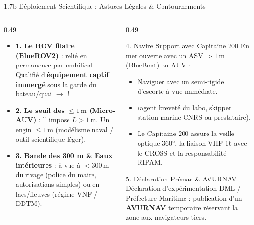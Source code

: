 \begin{frame}{1.7b Déploiement Scientifique : Astuces Légales \& Contournements}
  \begin{columns}[T]
    \begin{column}{0.49\textwidth}
      \begin{block}{}
        \scriptsize
        \begin{itemize}
          \item \textbf{1. Le ROV filaire (BlueROV2)} : relié en permanence par ombilical. Qualifié d'\textbf{équipement captif immergé} sous la garde du bateau/quai $\rightarrow$  !
          \item \textbf{2. Le seuil des $\le 1\,\text{m}$ (Micro-AUV)} : l'\href{https://www.legifrance.gouv.fr/codes/article_lc/LEGIARTI000049585210}{\underline{}} impose $L > 1\,\text{m}$. Un engin $\le 1\,\text{m}$  (modélisme naval / outil scientifique léger).
          \item \textbf{3. Bande des 300 m \& Eaux intérieures} : à vue à $<300\,\text{m}$ du rivage (police du maire, autorisations simples) ou en lacs/fleuves (régime VNF / DDTM).
        \end{itemize}
      \end{block}
    \end{column}

    \begin{column}{0.49\textwidth}
      \begin{alertblock}{4. Navire Support avec Capitaine 200}
        \scriptsize
        En mer ouverte avec un ASV $>1\,\text{m}$ (BlueBoat) ou AUV :
        \begin{itemize}\scriptsize
          \item Naviguer avec un semi-rigide d'escorte à vue immédiate.
          \item {} (agent breveté du labo, skipper station marine CNRS ou prestataire).
          \item Le Capitaine 200 assure la veille optique 360°, la liaison VHF 16 avec le CROSS et la responsabilité RIPAM.
        \end{itemize}
      \end{alertblock}

      \vspace{-0.3em}
      \begin{exampleblock}{5. Déclaration Prémar \& AVURNAV}
        \scriptsize
        Déclaration d'expérimentation DML / Préfecture Maritime : publication d'un \textbf{AVURNAV} temporaire réservant la zone aux navigateurs tiers.
      \end{exampleblock}
    \end{column}
  \end{columns}
\end{frame}


